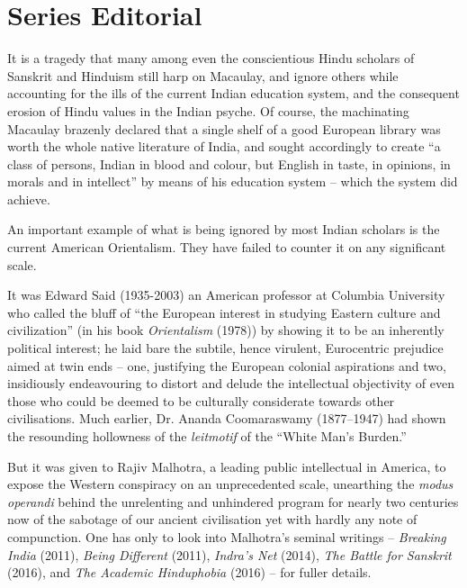 
\chapter*{Series Editorial}

It is a tragedy that many among even the conscientious Hindu scholars of Sanskrit and Hinduism still harp on Macaulay, and ignore others while accounting for the ills of the current Indian education system, and the consequent erosion of Hindu values in the Indian psyche. Of course, the machinating Macaulay brazenly declared that a single shelf of a good European library was worth the whole native literature of India, and sought accordingly to create “a class of persons, Indian in blood and colour, but English in taste, in opinions, in morals and in intellect” by means of his education system – which the system did achieve. 

An important example of what is being ignored by most Indian scholars is the current American Orientalism. They have failed to counter it on any significant scale. 

It was Edward Said (1935-2003) an American professor at Columbia University who called the bluff of “the European interest in studying Eastern culture and civilization” (in his book \textit{Orientalism} (1978)) by showing it to be an inherently political interest; he laid bare the subtile, hence virulent, Eurocentric prejudice aimed at twin ends – one, justifying the European colonial aspirations and two, insidiously endeavouring to distort and delude the intellectual objectivity of even those who could be deemed to be culturally considerate towards other civilisations. Much earlier, Dr. Ananda Coomaraswamy (1877–1947) had shown the resounding hollowness of the \textit{leitmotif} of the “White Man’s Burden.” 

But it was given to Rajiv Malhotra, a leading public intellectual in America, to expose the Western conspiracy on an unprecedented scale, unearthing the \textit{modus operandi} behind the unrelenting and unhindered program for nearly two centuries now of the sabotage of our ancient civilisation yet with hardly any note of compunction. One has only to look into Malhotra’s seminal writings – \textit{Breaking India} (2011), \textit{Being Different} (2011), \textit{Indra’s Net} (2014), \textit{The Battle for Sanskrit} (2016), and \textit{The Academic Hinduphobia} (2016) – for fuller details.

